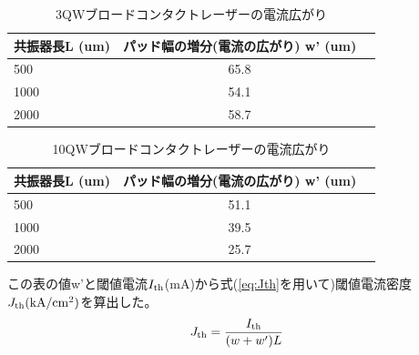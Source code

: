 \begin{table}[hbtp]
  \caption{3QWブロードコンタクトレーザーの電流広がり}
  \label{table_3QW_broadcontact_w_eff}
  \centering
  \begin{tabular}{lcr}
    \hline
    共振器長L (um)  & パッド幅の増分(電流の広がり) w' (um)   \\
    \hline \hline
     500 & 65.8  \\
    1000  & 54.1 \\
    2000  & 58.7 \\ 
    \hline
  \end{tabular}
\end{table}

\begin{table}[hbtp]
  \caption{10QWブロードコンタクトレーザーの電流広がり}
  \label{table_10QW_broadcontact_w_eff}
  \centering
  \begin{tabular}{lcr}
    \hline
    共振器長L (um)  & パッド幅の増分(電流の広がり) w' (um)   \\
    \hline \hline
     500 & 51.1  \\
    1000  & 39.5 \\
    2000  & 25.7 \\ 
    \hline
  \end{tabular}
\end{table}
この表の値w'と閾値電流$I_{\rm{th}}$(mA)から式(\ref{eq:Jth}を用いて)閾値電流密度$J_{\rm{th}} \rm{(kA/cm^2)}$を算出した。
\begin{eqnarray}
J_{\rm{th}}=\dfrac{I_{\rm{th}}}{(w+w')L}
\label{eq:Jth}
\end{eqnarray}

